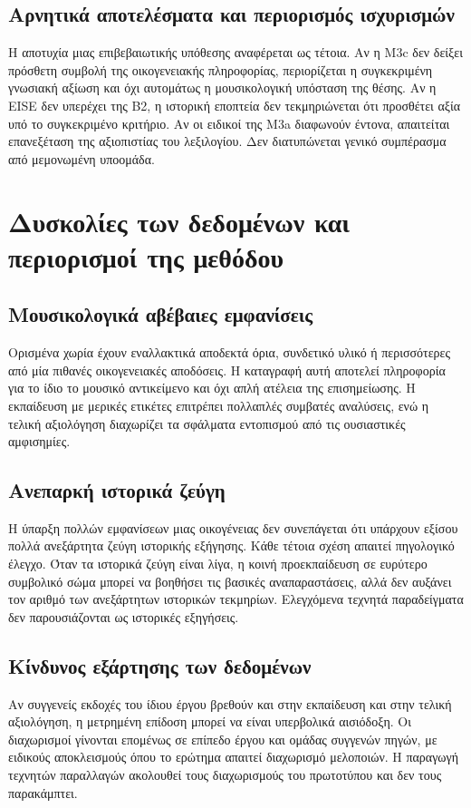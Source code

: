 \documentclass[11pt,a4paper]{extarticle}
\begin{document}
\subsection*{Αρνητικά αποτελέσματα και περιορισμός ισχυρισμών}
Η αποτυχία μιας επιβεβαιωτικής υπόθεσης αναφέρεται ως τέτοια. Αν η M3c δεν δείξει πρόσθετη συμβολή της οικογενειακής πληροφορίας, περιορίζεται η συγκεκριμένη γνωσιακή αξίωση και όχι αυτομάτως η μουσικολογική υπόσταση της θέσης. Αν η EISE δεν υπερέχει της B2, η ιστορική εποπτεία δεν τεκμηριώνεται ότι προσθέτει αξία υπό το συγκεκριμένο κριτήριο. Αν οι ειδικοί της M3a διαφωνούν έντονα, απαιτείται επανεξέταση της αξιοπιστίας του λεξιλογίου. Δεν διατυπώνεται γενικό συμπέρασμα από μεμονωμένη υποομάδα.

\section{Δυσκολίες των δεδομένων και περιορισμοί της μεθόδου}

\subsection*{Μουσικολογικά αβέβαιες εμφανίσεις}
Ορισμένα χωρία έχουν εναλλακτικά αποδεκτά όρια, συνδετικό υλικό ή περισσότερες από μία πιθανές οικογενειακές αποδόσεις. Η καταγραφή αυτή αποτελεί πληροφορία για το ίδιο το μουσικό αντικείμενο και όχι απλή ατέλεια της επισημείωσης. Η εκπαίδευση με μερικές ετικέτες επιτρέπει πολλαπλές συμβατές αναλύσεις, ενώ η τελική αξιολόγηση διαχωρίζει τα σφάλματα εντοπισμού από τις ουσιαστικές αμφισημίες.

\subsection*{Ανεπαρκή ιστορικά ζεύγη}
Η ύπαρξη πολλών εμφανίσεων μιας οικογένειας δεν συνεπάγεται ότι υπάρχουν εξίσου πολλά ανεξάρτητα ζεύγη ιστορικής εξήγησης. Κάθε τέτοια σχέση απαιτεί πηγολογικό έλεγχο. Όταν τα ιστορικά ζεύγη είναι λίγα, η κοινή προεκπαίδευση σε ευρύτερο συμβολικό σώμα μπορεί να βοηθήσει τις βασικές αναπαραστάσεις, αλλά δεν αυξάνει τον αριθμό των ανεξάρτητων ιστορικών τεκμηρίων. Ελεγχόμενα τεχνητά παραδείγματα δεν παρουσιάζονται ως ιστορικές εξηγήσεις.

\subsection*{Κίνδυνος εξάρτησης των δεδομένων}
Αν συγγενείς εκδοχές του ίδιου έργου βρεθούν και στην εκπαίδευση και στην τελική αξιολόγηση, η μετρημένη επίδοση μπορεί να είναι υπερβολικά αισιόδοξη. Οι διαχωρισμοί γίνονται επομένως σε επίπεδο έργου και ομάδας συγγενών πηγών, με ειδικούς αποκλεισμούς όπου το ερώτημα απαιτεί διαχωρισμό μελοποιών. Η παραγωγή τεχνητών παραλλαγών ακολουθεί τους διαχωρισμούς του πρωτοτύπου και δεν τους παρακάμπτει.
\end{document}
